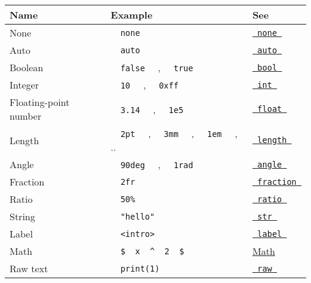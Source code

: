 \begin{longtable}[]{@{}lll@{}}
\toprule\noalign{}
Name & Example & See \\
\midrule\noalign{}
\endhead
\bottomrule\noalign{}
\endlastfoot
None & \texttt{\ }{\texttt{\ none\ }}\texttt{\ } &
\href{/docs/reference/foundations/none/}{\texttt{\ none\ }} \\
Auto & \texttt{\ }{\texttt{\ auto\ }}\texttt{\ } &
\href{/docs/reference/foundations/auto/}{\texttt{\ auto\ }} \\
Boolean & \texttt{\ }{\texttt{\ false\ }}\texttt{\ } ,
\texttt{\ }{\texttt{\ true\ }}\texttt{\ } &
\href{/docs/reference/foundations/bool/}{\texttt{\ bool\ }} \\
Integer & \texttt{\ }{\texttt{\ 10\ }}\texttt{\ } ,
\texttt{\ }{\texttt{\ 0xff\ }}\texttt{\ } &
\href{/docs/reference/foundations/int/}{\texttt{\ int\ }} \\
Floating-point number & \texttt{\ }{\texttt{\ 3.14\ }}\texttt{\ } ,
\texttt{\ }{\texttt{\ 1e5\ }}\texttt{\ } &
\href{/docs/reference/foundations/float/}{\texttt{\ float\ }} \\
Length & \texttt{\ }{\texttt{\ 2pt\ }}\texttt{\ } ,
\texttt{\ }{\texttt{\ 3mm\ }}\texttt{\ } ,
\texttt{\ }{\texttt{\ 1em\ }}\texttt{\ } , .. &
\href{/docs/reference/layout/length/}{\texttt{\ length\ }} \\
Angle & \texttt{\ }{\texttt{\ 90deg\ }}\texttt{\ } ,
\texttt{\ }{\texttt{\ 1rad\ }}\texttt{\ } &
\href{/docs/reference/layout/angle/}{\texttt{\ angle\ }} \\
Fraction & \texttt{\ }{\texttt{\ 2fr\ }}\texttt{\ } &
\href{/docs/reference/layout/fraction/}{\texttt{\ fraction\ }} \\
Ratio & \texttt{\ }{\texttt{\ 50\%\ }}\texttt{\ } &
\href{/docs/reference/layout/ratio/}{\texttt{\ ratio\ }} \\
String & \texttt{\ }{\texttt{\ "hello"\ }}\texttt{\ } &
\href{/docs/reference/foundations/str/}{\texttt{\ str\ }} \\
Label &
\texttt{\ }{\texttt{\ \textless{}intro\textgreater{}\ }}\texttt{\ } &
\href{/docs/reference/foundations/label/}{\texttt{\ label\ }} \\
Math &
\texttt{\ }{\texttt{\ \$\ }}\texttt{\ x\ }{\texttt{\ \^{}\ }}\texttt{\ 2\ }{\texttt{\ \$\ }}\texttt{\ }
& \href{/docs/reference/math/}{Math} \\
Raw text &
\texttt{\ }{\texttt{\ \textasciigrave{}print(1)\textasciigrave{}\ }}\texttt{\ }
& \href{/docs/reference/text/raw/}{\texttt{\ raw\ }} \\

\end{longtable}
